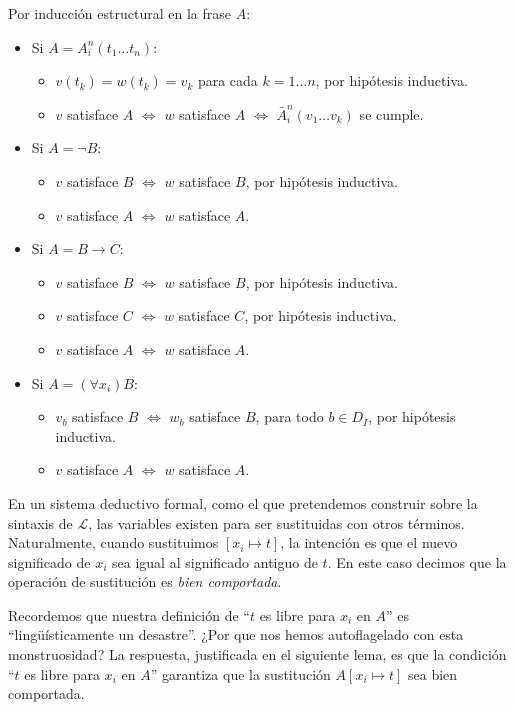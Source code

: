 \begin{prove}
Por inducción estructural en la frase $A$:

\begin{itemize}
    \item Si $A = A_i^n(t_1 \dots t_n)$:
    \begin{itemize}
        \item $v(t_k) = w(t_k) = v_k$ para cada $k = 1 \dots n$, por hipótesis inductiva.
        \item $v$ satisface $A$ $\iff$ $w$ satisface $A$ $\iff$ $\bar A_i^n(v_1 \dots v_k)$ se cumple.
    \end{itemize}
    
    \item Si $A = \neg B$:
    \begin{itemize}
        \item $v$ satisface $B$ $\iff$ $w$ satisface $B$, por hipótesis inductiva.
        \item $v$ satisface $A$ $\iff$ $w$ satisface $A$.
    \end{itemize}
    
    \item Si $A = B \to C$:
    \begin{itemize}
        \item $v$ satisface $B$ $\iff$ $w$ satisface $B$, por hipótesis inductiva.
        \item $v$ satisface $C$ $\iff$ $w$ satisface $C$, por hipótesis inductiva.
        \item $v$ satisface $A$ $\iff$ $w$ satisface $A$.
    \end{itemize}
    
    \item Si $A = (\forall x_i) B$:
    \begin{itemize}
        \item $v_b$ satisface $B$ $\iff$ $w_b$ satisface $B$, para todo $b \in D_I$, por hipótesis inductiva.
        \item $v$ satisface $A$ $\iff$ $w$ satisface $A$.
    \end{itemize}
\end{itemize}
\end{prove}

\begin{motivation}
En un sistema deductivo formal, como el que pretendemos construir sobre la sintaxis de $\mathscr L$, las variables existen para ser sustituidas con otros términos. Naturalmente, cuando sustituimos $[x_i \mapsto t]$, la intención es que el nuevo significado de $x_i$ sea igual al significado antiguo de $t$. En este caso decimos que la operación de sustitución es \textit{bien comportada}.

Recordemos que nuestra definición de ``$t$ es libre para $x_i$ en $A$'' es ``lingüísticamente un desastre''. ¿Por que nos hemos autoflagelado con esta monstruosidad? La respuesta, justificada en el siguiente lema, es que la condición ``$t$ es libre para $x_i$ en $A$'' garantiza que la sustitución $A[x_i \mapsto t]$ sea bien comportada.
\end{motivation}

